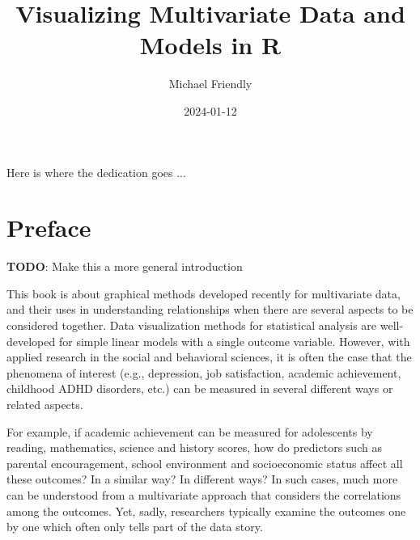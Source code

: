 \documentclass[
  letterpaper,
  10pt,
  krantz2]{krantz}
\title{Visualizing Multivariate Data and Models in R}
\author{Michael Friendly}
\date{2024-01-12}
\renewcommand*\contentsname{Table of contents}
\newcommand\contentsname{Table of contents}
\begin{document}
\maketitle

\thispagestyle{empty}

\begin{center}
Here is where the dedication goes ...
\end{center}

\setlength{\abovedisplayskip}{-5pt}
\setlength{\abovedisplayshortskip}{-5pt}

\ifdefined\Shaded\renewenvironment{Shaded}{\begin{tcolorbox}[borderline west={3pt}{0pt}{shadecolor}, frame hidden, colback={codebgcolor}, boxrule=0pt, enhanced, sharp corners, breakable]}{\end{tcolorbox}}\fi

\renewcommand*\contentsname{Table of contents}
{
\hypersetup{linkcolor=}
\setcounter{tocdepth}{2}
\tableofcontents
}

\hypertarget{preface}{%
\chapter*{Preface}\label{preface}}


\textbf{TODO}: Make this a more general introduction

This book is about graphical methods developed recently for multivariate
data, and their uses in understanding relationships when there are
several aspects to be considered together. Data visualization methods
for statistical analysis are well-developed for simple linear models
with a single outcome variable. However, with applied research in the
social and behavioral sciences, it is often the case that the phenomena
of interest (e.g., depression, job satisfaction, academic achievement,
childhood ADHD disorders, etc.) can be measured in several different
ways or related aspects.

For example, if academic achievement can be measured for adolescents by
reading, mathematics, science and history scores, how do predictors such
as parental encouragement, school environment and socioeconomic status
affect all these outcomes? In a similar way? In different ways? In such
cases, much more can be understood from a multivariate approach that
considers the correlations among the outcomes. Yet, sadly, researchers
typically examine the outcomes one by one which often only tells part of
the data story.
\end{document}
